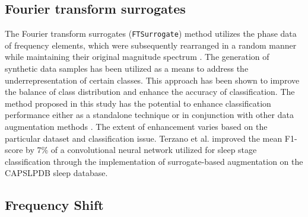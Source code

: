 \documentclass[12pt]{iopart}
\begin{document}
\subsection{Fourier transform surrogates}
The Fourier transform surrogates (\texttt{FTSurrogate}) method utilizes the phase data of frequency elements, which were subsequently rearranged in a random manner while maintaining their original magnitude spectrum \cite{schwabedal2018addressing}. The generation of synthetic data samples has been utilized as a means to address the underrepresentation of certain classes. This approach has been shown to improve the balance of class distribution and enhance the accuracy of classification. The method proposed in this study has the potential to enhance classification performance either as a standalone technique or in conjunction with other data augmentation methods \cite{schwabedal2018addressing}. The extent of enhancement varies based on the particular dataset and classification issue. Terzano et al. \cite{terzano2001atlas} improved the mean F1-score by 7\% of a convolutional neural network utilized for sleep stage classification through the implementation of surrogate-based augmentation on the CAPSLPDB sleep database.

\subsection{Frequency Shift}
\end{document}
